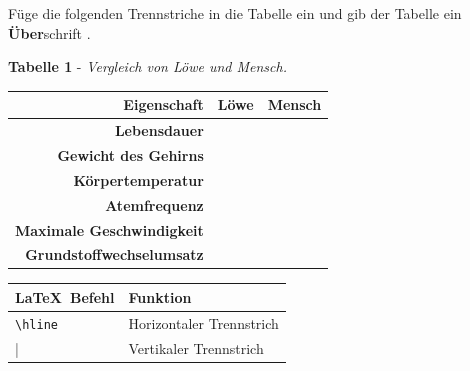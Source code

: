 \documentclass["WS\space 16-17\space -\space LaTeX-Kurs\space -\space Praesentation\space -\space 2.tex"]{subfiles}
\begin{document}
\begin{frame}[fragile]
	\begin{Aufgabe}
		Füge die folgenden Trennstriche in die Tabelle ein und gib der Tabelle ein \textbf{Über}schrift \textrm{}.
	\end{Aufgabe}
	\begin{outputbox}
		\vspace{-0.2cm}
		\begin{center}
			\textbf{Tabelle 1} - \textit{Vergleich von Löwe und Mensch.}\vspace{0.1cm}
			\begin{tabular}{r|cc}
				\hline
				\textbf{Eigenschaft}				&	\textbf{Löwe}				& \textbf{Mensch} 	\\ \hline
				\textbf{Lebensdauer} 				&								& 					\\ 
				\textbf{Gewicht des Gehirns}		&								& 					\\ 
				\textbf{Körpertemperatur}			&								& 					\\
				\textbf{Atemfrequenz}				&								& 					\\
				\textbf{Maximale Geschwindigkeit}	&								& 					\\ 
				\textbf{Grundstoffwechselumsatz}	&								& 					\\
				\hline
			\end{tabular}
		\end{center}
		\vspace{-0.2cm}
	\end{outputbox}
	
	\btVFill\Befehle
	\begin{center}
		\begin{tabular}{ll}
			\toprule
			\LaTeX\ Befehl								&	Funktion								\\ \midrule
			\lstinline|\hline|							&	Horizontaler Trennstrich				\\
			\lstinline|||								&	Vertikaler Trennstrich					\\
			\bottomrule
		\end{tabular}
	\end{center}
	\vspace{0.1cm}
\end{frame}
\end{document}
